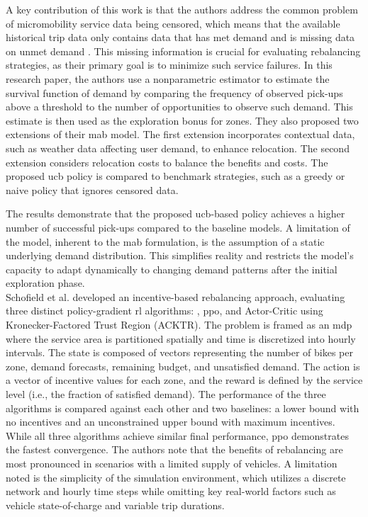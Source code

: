 A key contribution of this work is that the authors address the common problem of micromobility service data being censored, which means that the available historical trip data only contains data that has met demand and is missing data on unmet demand \cite{gammelli_estimating_2020}. 
This missing information is crucial for evaluating rebalancing strategies, as their primary goal is to minimize such service failures.
In this research paper, the authors use a nonparametric estimator to estimate the survival function of demand by comparing the frequency of observed pick-ups above a threshold to the number of opportunities to observe such demand. 
This estimate is then used as the exploration bonus for zones. 
They also proposed two extensions of their \gls{mab} model. The first extension incorporates contextual data, such as weather data affecting user demand, to enhance relocation. The second extension considers relocation costs to balance the benefits and costs.
The proposed \gls{ucb} policy is compared to benchmark strategies, such as a greedy or naive policy that ignores censored data. 

The results demonstrate that the proposed \gls{ucb}-based policy achieves a higher number of successful pick-ups compared to the baseline models.
A limitation of the model, inherent to the \gls{mab} formulation, is the assumption of a static underlying demand distribution.
This simplifies reality and restricts the model's capacity to adapt dynamically to changing demand patterns after the initial exploration phase.
\\

Schofield et al. \cite{schofield_handling_2021} developed an incentive-based rebalancing approach, evaluating three distinct policy-gradient \gls{rl} algorithms: , \gls{ppo}, and Actor-Critic using Kronecker-Factored Trust Region (ACKTR).
The problem is framed as an \gls{mdp} where the service area is partitioned spatially and time is discretized into hourly intervals.
The state is composed of vectors representing the number of bikes per zone, demand forecasts, remaining budget, and unsatisfied demand.
The action is a vector of incentive values for each zone, and the reward is defined by the service level (i.e., the fraction of satisfied demand).
The performance of the three algorithms is compared against each other and two baselines: a lower bound with no incentives and an unconstrained upper bound with maximum incentives.
While all three algorithms achieve similar final performance, \gls{ppo} demonstrates the fastest convergence.
The authors note that the benefits of rebalancing are most pronounced in scenarios with a limited supply of vehicles.
A limitation noted is the simplicity of the simulation environment, which utilizes a discrete network and hourly time steps while omitting key real-world factors such as vehicle state-of-charge and variable trip durations.
\\

